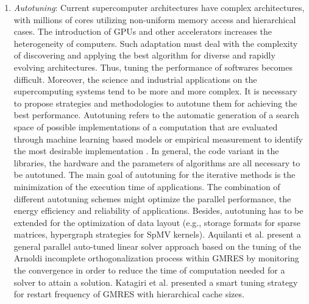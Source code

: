 {\begin{enumerate}[label=(\arabic*)]
	\item \textit{Autotuning}: Current supercomputer architectures have complex architectures, with millions of cores utilizing non-uniform memory access and hierarchical cases. The introduction of GPUs and other accelerators increases the heterogeneity of computers. Such adaptation must deal with the complexity of discovering and applying the best algorithm for diverse and rapidly evolving architectures. Thus, tuning the performance of softwares becomes difficult. Moreover, the science and industrial applications on the supercomputing systems tend to be more and more complex. It is necessary to propose strategies and methodologies to autotune them for achieving the best performance. Autotuning refers to the automatic generation of a search space of possible implementations of a computation that are evaluated through machine learning based models or empirical measurement to identify the most desirable implementation \cite{balaprakash2018autotuning}. In general, the code variant in the libraries, the hardware and the parameters of algorithms are all necessary to be autotuned. The main goal of autotuning for the iterative methods is the minimization of the execution time of applications. The combination of different autotuning schemes might optimize the parallel performance, the energy efficiency and reliability of applications.  Besides, autotuning has to be extended for the optimization of data layout (e.g., storage formats for sparse matrices, hypergraph strategies for SpMV kernels). Aquilanti et al. \cite{aquilanti2011parallel} present a general parallel auto-tuned linear solver approach based on the tuning of the Arnoldi incomplete orthogonalization process within GMRES by monitoring the convergence in order to reduce the time of computation needed for a solver to attain a solution. Katagiri et al. \cite{katagiri2012smart} presented a smart tuning strategy for restart frequency of GMRES with hierarchical cache sizes. 
		

\end{enumerate}}
